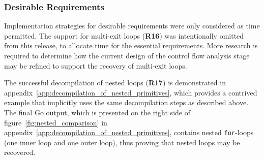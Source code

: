 
\subsubsection{Desirable Requirements}
\label{sec:eval_control_flow_analysis_library_desirable_requirements}


Implementation strategies for desirable requirements were only considered as time permitted. The support for multi-exit loops (\textbf{R16}) was intentionally omitted from this release, to allocate time for the essential requirements. More research is required to determine how the current design of the control flow analysis stage may be refined to support the recovery of multi-exit loops.


The successful decompilation of nested loops (\textbf{R17}) is demonstrated in appendix~\ref{app:decompilation_of_nested_primitives}, which provides a contrived example that implicitly uses the same decompilation steps as described above. The final Go output, which is presented on the right side of figure~\ref{fig:nested_comparison} in appendix~\ref{app:decompilation_of_nested_primitives}, contains nested \texttt{for}-loops (one inner loop and one outer loop), thus proving that nested loops may be recovered.
